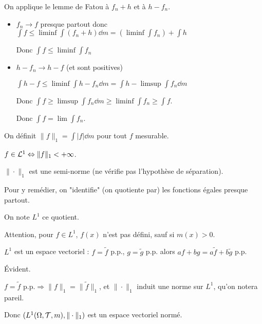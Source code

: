 \documentclass[10pt,a4paper,notitlepage ]{report}
\begin{document}
\begin{demo}
	On applique le lemme de Fatou à $f_n+h$ et à $h-f_n$.
	\begin{itemize}
		\item $f_n \rightarrow f$ presque partout donc $\int f \le \liminf \int(f_n+h) \dd m = (\liminf \int f_n) + \int h$
		
		Donc $\int f \le \liminf \int f_n$
		\item $h-f_n \rightarrow  h-f$ (et sont positives)
		
		$\int h-f \le \liminf \int h - f_n \dd m = \int h - \limsup \int f_n \dd m$
		
		Donc $\int f \ge \limsup \int f_n \dd m \ge \liminf \int f_n \ge \int f$.
		
		Donc $\int f = \lim \int f_n$.
	\end{itemize}
\end{demo}

\begin{definition}[L'espace $\LL^1$]
	On définit $\|f\|_1 = \int|f|\dd m$ pour tout $f$ mesurable.
	
	$f\in \mathcal L^1 \Leftrightarrow \|f\|_1 < + \infty$.
	
	$\|\cdot \|_1$ est une semi-norme (ne vérifie pas l'hypothèse de séparation).
\end{definition}

Pour y remédier, on "identifie" (on quotiente par) les fonctions égales presque partout.

On note $L^1$ ce quotient.

\begin{rem}
	Attention, pour $f\in L^1$, $f(x)$ n'est pas défini, sauf si $m({x}) > 0$.
\end{rem}

\begin{propriete}
	$L^1$ est un espace vectoriel :
	$f=\tilde f$ p.p., $g=\tilde g$ p.p. alors $af+bg = a\tilde f + b\tilde g$ p.p.
\end{propriete}
\begin{demo}
	Évident.
\end{demo}

\begin{propriete}
	$f = \tilde f  \text{ p.p.}\Rightarrow \|f\|_1 = \|\tilde f\|_1$, et $\|\cdot \|_1$ induit une norme sur $L^1$, qu'on notera pareil.
	
	Donc $(L^1(\Omega,\mathcal T,m), \|\cdot\|_1)$ est un espace vectoriel normé.
\end{propriete}
\end{document}
